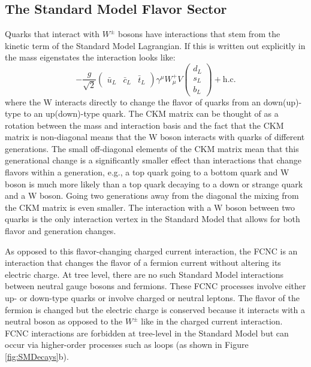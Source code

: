 \subsection{The Standard Model Flavor Sector}
Quarks that interact with $W^\pm$ bosons have interactions that stem from the kinetic term of the Standard Model Lagrangian.  If this is written out explicitly in the mass eigenstates the interaction looks like:
\[ -\frac{g}{\sqrt{2}}\begin{pmatrix} \bar{u}_L & \bar{c}_L &\bar{t}_L \end{pmatrix} \gamma^\mu W_\mu^+ V\begin{pmatrix} d_L\\s_L\\b_L\end{pmatrix}+\text{h.c.}
\]
where the W interacts directly to change the flavor of quarks from an down(up)-type to an up(down)-type quark.  The CKM matrix can be thought of as a rotation between the mass and interaction basis and the fact that the CKM matrix is non-diagonal means that the W boson interacts with quarks of different generations.  The small off-diagonal elements of the CKM matrix mean that this generational change is a significantly smaller effect than interactions that change flavors within a generation, e.g., a top quark going to a bottom quark and W boson is much more likely than a top quark decaying to a down or strange quark and a W boson.  Going two generations away from the diagonal the mixing from the CKM matrix is even smaller.  The interaction with a W boson between two quarks is the only interaction vertex in the Standard Model that allows for both flavor and generation changes.

As opposed to this flavor-changing charged current interaction, the FCNC is an interaction that changes the flavor of a fermion current without altering its electric charge.  At tree level, there are no such Standard Model interactions between neutral gauge bosons and fermions.  These FCNC processes involve either up- or down-type quarks or involve charged or neutral leptons.  The flavor of the fermion is changed but the electric charge is conserved because it interacts with a neutral boson as opposed to the $W^\pm$ like in the charged current interaction.  FCNC interactions are forbidden at tree-level in the Standard Model but can occur via higher-order processes such as loops (as shown in Figure \ref{fig:SMDecays}b).


